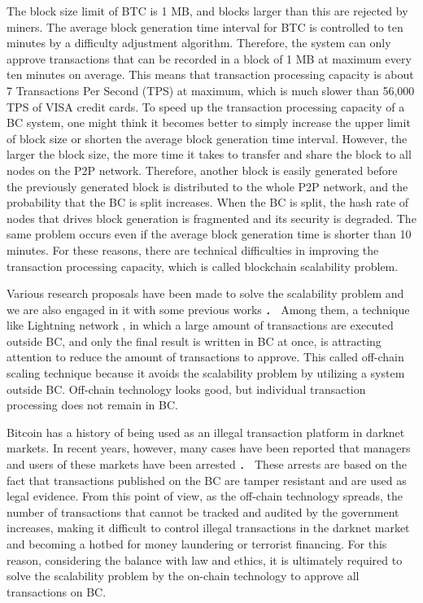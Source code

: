 \documentclass[graybox]{svmult}
\begin{document}
The block size limit of BTC is 1 MB, and blocks larger than this are rejected by miners. 
The average block generation time interval for BTC is controlled to ten minutes by a difficulty adjustment algorithm. 
Therefore, the system can only approve transactions that can be recorded in a block of 1 MB at maximum every ten minutes on average. 
This means that transaction processing capacity is about 7 Transactions Per Second (TPS) at maximum, which is much slower than 56,000 TPS of VISA credit cards. 
To speed up the transaction processing capacity of a BC system, one might think it becomes better to simply increase the upper limit of block size or shorten the average block generation time interval. 
However, the larger the block size, the more time it takes to transfer and share the block to all nodes on the P2P network. 
Therefore, another block is easily generated before the previously generated block is distributed to the whole P2P network, and the probability that the BC is split increases. 
When the BC is split, the hash rate of nodes that drives block generation is fragmented and its security is degraded. 
The same problem occurs even if the average block generation time is shorter than 10 minutes. 
For these reasons, there are technical difficulties in improving the transaction processing capacity, which is called blockchain scalability problem.


Various research proposals have been made to solve the scalability problem \cite{ZHZB2020} and we are also engaged in it with some previous works \cite{Fujihara2018,Fujihara2019,Fujihara2020,YF2021a,YF2021b}．
Among them, a technique like Lightning network \cite{PD2016}, in which a large amount of transactions are executed outside BC, and only the final result is written in BC at once, is attracting attention to reduce the amount of transactions to approve. 
This called off-chain scaling technique because it avoids the scalability problem by utilizing a system outside BC. 
Off-chain technology looks good, but individual transaction processing does not remain in BC.


Bitcoin has a history of being used as an illegal transaction platform in darknet markets.
In recent years, however, many cases have been reported that managers and users of these markets have been arrested \cite{silkroad,alphabay,welcome2video}．
These arrests are based on the fact that transactions published on the BC are tamper resistant and are used as legal evidence.
From this point of view, as the off-chain technology spreads, the number of transactions that cannot be tracked and audited by the government increases, making it difficult to control illegal transactions in the darknet market and becoming a hotbed for money laundering or terrorist financing.
For this reason, considering the balance with law and ethics, it is ultimately required to solve the scalability problem by the on-chain technology to approve all transactions on BC. 
\end{document}
